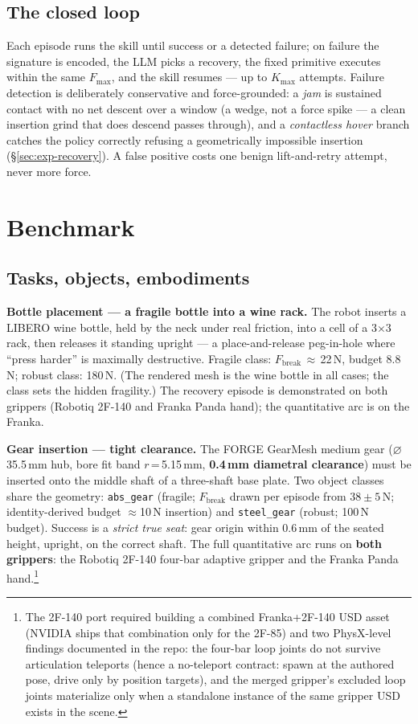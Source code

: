 \documentclass[11pt]{article}
\newcommand{\Fmax}{\ensuremath{F_{\max}}}
\newcommand{\Fbreak}{\ensuremath{F_{\mathrm{break}}}}
\newcommand{\code}[1]{\texttt{\small #1}}
\begin{document}
\subsection{The closed loop}

Each episode runs the skill until success or a detected failure; on failure the signature is encoded, the LLM picks a recovery, the fixed primitive executes within the same \Fmax{}, and the skill resumes --- up to $K_{\max}$ attempts. Failure detection is deliberately conservative and force-grounded: a \emph{jam} is sustained contact with no net descent over a window (a wedge, not a force spike --- a clean insertion grind that does descend passes through), and a \emph{contactless hover} branch catches the policy correctly refusing a geometrically impossible insertion (\S\ref{sec:exp-recovery}). A false positive costs one benign lift-and-retry attempt, never more force.

\section{Benchmark}
\label{sec:benchmark}

\subsection{Tasks, objects, embodiments}

\textbf{Bottle placement --- a fragile bottle into a wine rack.} The robot inserts a LIBERO wine bottle, held by the neck under real friction, into a cell of a 3$\times$3 rack, then releases it standing upright --- a place-and-release peg-in-hole where ``press harder'' is maximally destructive. Fragile class: \Fbreak\,$\approx$\,22\,N, budget 8.8\,N; robust class: 180\,N. (The rendered mesh is the wine bottle in all cases; the class sets the hidden fragility.) The recovery episode is demonstrated on both grippers (Robotiq 2F-140 and Franka Panda hand); the quantitative arc is on the Franka.

\textbf{Gear insertion --- tight clearance.} The FORGE GearMesh medium gear ($\varnothing$35.5\,mm hub, bore fit band $r$\,=\,5.15\,mm, \textbf{0.4\,mm diametral clearance}) must be inserted onto the middle shaft of a three-shaft base plate. Two object classes share the geometry: \code{abs\_gear} (fragile; \Fbreak{} drawn per episode from $38\pm5$\,N; identity-derived budget $\approx$10\,N insertion) and \code{steel\_gear} (robust; 100\,N budget). Success is a \emph{strict true seat}: gear origin within 0.6\,mm of the seated height, upright, on the correct shaft. The full quantitative arc runs on \textbf{both grippers}: the Robotiq 2F-140 four-bar adaptive gripper and the Franka Panda hand.\footnote{The 2F-140 port required building a combined Franka+2F-140 USD asset (NVIDIA ships that combination only for the 2F-85) and two PhysX-level findings documented in the repo: the four-bar loop joints do not survive articulation teleports (hence a no-teleport contract: spawn at the authored pose, drive only by position targets), and the merged gripper's excluded loop joints materialize only when a standalone instance of the same gripper USD exists in the scene.}
\end{document}
